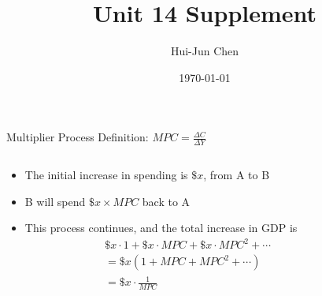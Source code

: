 \documentclass{beamer}
\title{Unit 14 Supplement}
\author{Hui-Jun Chen}
\institute{The Ohio State University}
\date{\today}
\begin{document}
\maketitle



\begin{frame}{Multiplier Process}
\label{slide:Multiplier_Process}
    Definition: $ MPC = \frac{\Delta C}{\Delta Y} $

    \begin{columns}
        \begin{column}{0.6\textwidth}
        \begin{itemize}
            \item The initial increase in spending is $ \$x $, from A to B
            \item B will spend $ \$x \times MPC $ back to A
            \item This process continues, and the total increase in GDP is
                    \begin{equation*}
                        \begin{split}
                                & \$x \cdot 1 + \$x \cdot MPC + \$x \cdot MPC^{2} + \cdots
                            \\
                                & = \$x ( 1 + MPC + MPC^{2} + \cdots )
                            \\
                                & = \$x \cdot \frac{1}{MPC}
                            \\
                        \end{split}
                    \end{equation*}
        \end{itemize}
        \end{column}
        \begin{column}{0.5\textwidth}
\end{column}
\end{columns}
\end{frame}
\end{document}
